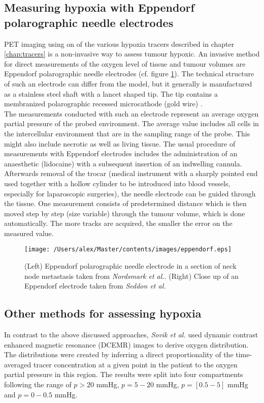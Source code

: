 \subsection[Eppendorf polarographic needle electrodes]{Measuring hypoxia with Eppendorf polarographic needle electrodes}\label{chap:eppendorf}
PET imaging using on of the various hypoxia tracers described in chapter \ref{chap:tracers} is a non-invasive way to assess tumour hypoxic. An invasive method for direct measurements of the oxygen level of tissue and tumour volumes are Eppendorf polarographic needle electrodes (cf. figure \ref{fig:eppendorf}). The technical structure of such an electrode can differ from the model, but it generally is manufactured as a stainless steel shaft with a lancet shaped tip. The tip contains a membranized polarographic recessed microcathode (gold wire) \cite{pmid8018370}.\\The measurements conducted with such an electrode represent an average oxygen partial pressure of the probed environment. The average value includes all cells in the intercellular environment that are in the sampling range of the probe. This might also include necrotic as well as living tissue. The usual procedure of measurements with Eppendorf electrodes includes the administration of an anaesthetic (lidocaine) with a subsequent insertion of an indwelling cannula. Afterwards removal of the trocar (medical instrument with a sharply pointed end used together with a hollow cylinder to be introduced into blood vessels, especially for laparoscopic surgeries), the needle electrode can be guided through the tissue. One measurement consists of predetermined distance which is then moved step by step (size variable) through the tumour volume, which is done automatically. The more tracks are acquired, the smaller the error on the measured value. 
\begin{figure}[hbt]
\centering
\texttt{[image: /Users/alex/Master/contents/images/eppendorf.eps]}
\vspace{1cm}
\caption{(Left) Eppendorf polarographic needle electrode in a section of neck node metastasis taken from \textit{Nordsmark et al.}\cite{pmid8018370}. (Right) Close up of an Eppendorf electrode taken from \textit{Seddon et al.}\cite{pmid11352767}}
\label{fig:eppendorf}
\end{figure}
\subsection{Other methods for assessing hypoxia}\label{chap:otherhypoxiamethods}
In contrast to the above discussed approaches, \textit{Sovik et al.} \cite{pmid17674980} used dynamic contrast enhanced magnetic resonance (DCEMR) images to derive oxygen distribution. The distributions were created by inferring a direct proportionality of the time-averaged tracer concentration at a given point in the patient to the oxygen partial pressure in this region. The results were split into four compartments following the range of $p>20$ mmHg, $p=5-20$ mmHg, $p=[0.5-5]$ mmHg and $p = 0-0.5$ mmHg.
